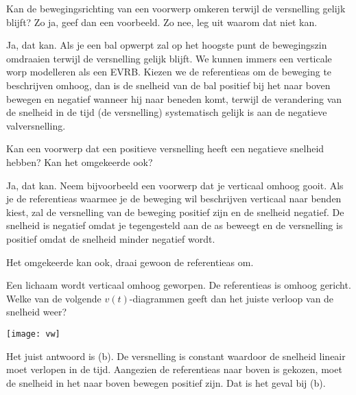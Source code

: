 \documentclass{ximera}
\begin{document}
\begin{exercise}
	Kan de bewegingsrichting van een voorwerp omkeren terwijl de versnelling gelijk blijft? Zo ja, geef dan een voorbeeld. Zo nee, leg uit waarom dat niet kan.
	\begin{oplossing}
		Ja, dat kan. Als je een bal opwerpt zal op het hoogste punt de bewegingszin omdraaien terwijl de versnelling gelijk blijft. We kunnen immers een verticale worp modelleren als een EVRB. Kiezen we de referentieas om de beweging te beschrijven omhoog, dan is de snelheid van de bal positief bij het naar boven bewegen en negatief wanneer hij naar beneden komt, terwijl de verandering van de snelheid in de tijd (de versnelling) systematisch gelijk is aan de negatieve valversnelling.
	\end{oplossing}
\end{exercise}

\begin{exercise}
	Kan een voorwerp dat een positieve versnelling heeft een negatieve snelheid hebben? Kan het omgekeerde ook?%
	\begin{oplossing}
		Ja, dat kan. Neem bijvoorbeeld een voorwerp dat je verticaal omhoog gooit. Als je de referentieas waarmee je de beweging wil beschrijven verticaal naar benden kiest, zal de versnelling van de beweging positief zijn en de snelheid negatief. De snelheid is negatief omdat je tegengesteld aan de as beweegt en de versnelling is positief omdat de snelheid minder negatief wordt.

		Het omgekeerde kan ook, draai gewoon de referentieas om.
	\end{oplossing}
\end{exercise}

\begin{exercise}
	Een lichaam wordt verticaal omhoog geworpen. De referentieas is omhoog gericht. Welke van de volgende $v(t)$-diagrammen geeft dan het juiste verloop van de snelheid weer?
	\begin{image}[.92\textwidth]
		\texttt{[image: vw]}
	\end{image}
	\begin{oplossing}
		Het juist antwoord is (b). De versnelling is constant waardoor de snelheid lineair moet verlopen in de tijd. Aangezien de referentieas naar boven is gekozen, moet de snelheid in het naar boven bewegen positief zijn. Dat is het geval bij (b).
	\end{oplossing}
\end{exercise}
\end{document}

